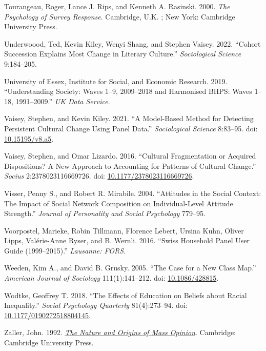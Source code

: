 \documentclass[
  12pt,
]{article}
\newlength{\cslhangindent}
\newlength{\cslentryspacingunit} %
\newenvironment{CSLReferences}[2] %
 {%
  \setlength{\parindent}{0pt}
  \ifodd #1
  \let\oldpar\par
  \def\par{\hangindent=\cslhangindent\oldpar}
  \fi
  \setlength{\parskip}{#2\cslentryspacingunit}
 }%
 {}
\begin{document}
\begin{CSLReferences}{1}{0}
\leavevmode{}%
Tourangeau, Roger, Lance J. Rips, and Kenneth A. Rasinski. 2000.
\emph{The Psychology of Survey Response}. Cambridge, U.K. ; New York:
Cambridge University Press.

\leavevmode{}%
Underwoood, Ted, Kevin Kiley, Wenyi Shang, and Stephen Vaisey. 2022.
{``Cohort Succession Explains Most Change in Literary Culture.''}
\emph{Sociological Science} 9:184--205.

\leavevmode{}%
University of Essex, Institute for Social, and Economic Research. 2019.
{``Understanding Society: Waves 1--9, 2009--2018 and Harmonised BHPS:
Waves 1--18, 1991--2009.''} \emph{UK Data Service}.

\leavevmode{}%
Vaisey, Stephen, and Kevin Kiley. 2021. {``A {Model}-{Based} {Method}
for {Detecting} {Persistent} {Cultural} {Change} {Using} {Panel}
{Data}.''} \emph{Sociological Science} 8:83--95. doi:
\href{https://doi.org/10.15195/v8.a5}{10.15195/v8.a5}.

\leavevmode{}%
Vaisey, Stephen, and Omar Lizardo. 2016. {``Cultural {Fragmentation} or
{Acquired} {Dispositions}? {A} {New} {Approach} to {Accounting} for
{Patterns} of {Cultural} {Change}.''} \emph{Socius} 2:2378023116669726.
doi:
\href{https://doi.org/10.1177/2378023116669726}{10.1177/2378023116669726}.

\leavevmode{}%
Visser, Penny S., and Robert R. Mirabile. 2004. {``Attitudes in the
Social Context: {The} Impact of Social Network Composition on
Individual-Level Attitude Strength.''} \emph{Journal of Personality and
Social Psychology} 779--95.

\leavevmode{}%
Voorpostel, Marieke, Robin Tillmann, Florence Lebert, Ursina Kuhn,
Oliver Lipps, Valérie-Anne Ryser, and B. Wernli. 2016. {``Swiss
Household Panel User Guide (1999--2015).''} \emph{Lausanne: FORS}.

\leavevmode{}%
Weeden, Kim A., and David B. Grusky. 2005. {``The {Case} for a {New}
{Class} {Map}.''} \emph{American Journal of Sociology} 111(1):141--212.
doi: \href{https://doi.org/10.1086/428815}{10.1086/428815}.

\leavevmode{}%
Wodtke, Geoffrey T. 2018. {``The {Effects} of {Education} on {Beliefs}
about {Racial} {Inequality}.''} \emph{Social Psychology Quarterly}
81(4):273--94. doi:
\href{https://doi.org/10.1177/0190272518804145}{10.1177/0190272518804145}.

\leavevmode{}%
Zaller, John. 1992.
\emph{\href{https://doi.org/10.1017/CBO9780511818691}{The {Nature} and
{Origins} of {Mass} {Opinion}}}. Cambridge: Cambridge University Press.

\end{CSLReferences}
\end{document}
